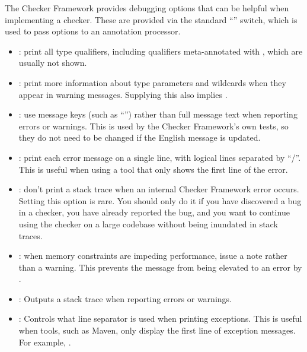 The Checker Framework provides debugging options that can be helpful when
implementing a checker. These are provided via the standard  ``''
switch, which is used to pass options to an annotation processor.



\begin{itemize}
\item {}: print all type qualifiers, including
qualifiers meta-annotated with
, which are
usually not shown.

\item {}: print more information about type
  parameters and wildcards when they appear in warning messages.  Supplying
  this also implies .

\item {}: use message keys (such as ``'')
rather than full message text when reporting errors or warnings.  This is
used by the Checker Framework's own tests, so they do not need to be
changed if the English message is updated.

\item {}: print each error message on a single line, with
logical lines separated by ``/''.  This is useful when using a tool that
only shows the first line of the error.

\item {}: don't print a stack trace when an
internal Checker Framework error occurs.  Setting this option is rare.  You
should only do it if you have discovered a bug in a checker, you have
already reported the bug, and you want to continue using the checker on a
large codebase without being inundated in stack traces.

\item {}: when memory constraints are
impeding performance, issue a note rather than a warning.
This prevents the message from being elevated to an error by .

\item {}: Outputs a stack trace when reporting errors or warnings.

\item {}: Controls what line separator is used when printing exceptions.
This is useful when tools, such as Maven, only display the first line of exception messages. For
example, .

\end{itemize}


